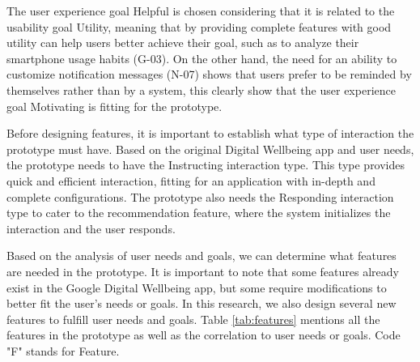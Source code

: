 \documentclass[conference]{IEEEtran}
\begin{document}
The user experience goal Helpful is chosen considering that it is related to the usability goal Utility, meaning that by providing complete features with good utility can help users better achieve their goal, such as to analyze their smartphone usage habits (G-03). On the other hand, the need for an ability to customize notification messages (N-07) shows that users prefer to be reminded by themselves rather than by a system, this clearly show that the user experience goal Motivating is fitting for the prototype.

Before designing features, it is important to establish what type of interaction the prototype must have. Based on the original Digital Wellbeing app and user needs, the prototype needs to have the Instructing interaction type. This type provides quick and efficient interaction, fitting for an application with in-depth and complete configurations. The prototype also needs the Responding interaction type to cater to the recommendation feature, where the system initializes the interaction and the user responds.

Based on the analysis of user needs and goals, we can determine what features are needed in the prototype. It is important to note that some features already exist in the Google Digital Wellbeing app, but some require modifications to better fit the user's needs or goals. In this research, we also design several new features to fulfill user needs and goals. Table \ref{tab:features} mentions all the features in the prototype as well as the correlation to user needs or goals. Code "F" stands for Feature.
\end{document}
